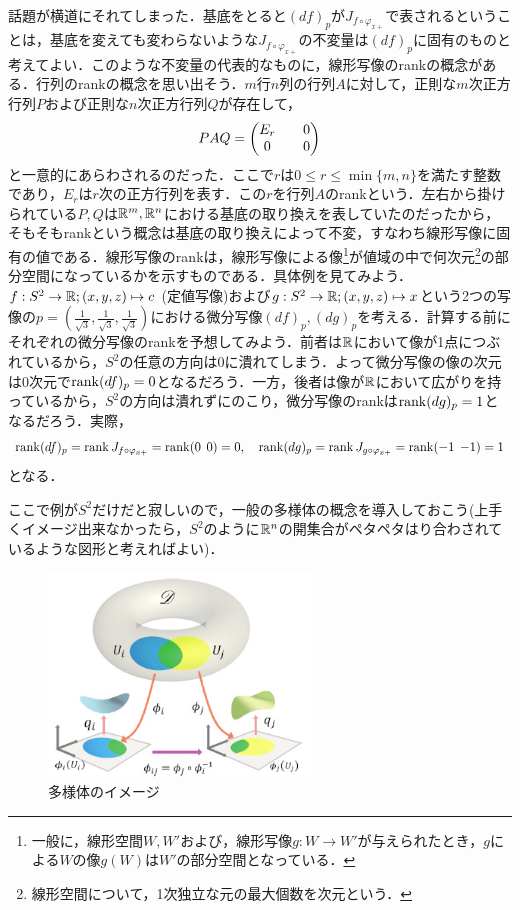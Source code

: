 話題が横道にそれてしまった．基底をとると$(df)_p$が$J_{f\circ\varphi_{x+}}$で表されるということは，基底を変えても変わらないような$J_{f\circ\varphi_{x+}}$の不変量は$(df)_p$に固有のものと考えてよい．このような不変量の代表的なものに，線形写像のrankの概念がある．行列のrankの概念を思い出そう．$m$行$n$列の行列$A$に対して，正則な$m$次正方行列$P$および正則な$n$次正方行列$Q$が存在して，
$$
PAQ=\begin{pmatrix} E_r && 0 \\ 0 && 0 \end{pmatrix}
$$
と一意的にあらわされるのだった．ここで$r$は$0\le r \le \min\{m,n\}$を満たす整数であり，$E_r$は$r$次の正方行列を表す．この$r$を行列$A$のrankという．左右から掛けられている$P,Q$は${\mathbb R}^m,{\mathbb R}^n$における基底の取り換えを表していたのだったから，そもそもrankという概念は基底の取り換えによって不変，すなわち線形写像に固有の値である．線形写像のrankは，線形写像による像\footnote{一般に，線形空間$W,W'$および，線形写像$g:W\rightarrow W'$が与えられたとき，$g$による$W$の像$g(W)$は$W'$の部分空間となっている．}が値域の中で何次元\footnote{線形空間について，1次独立な元の最大個数を次元という．}の部分空間になっているかを示すものである．具体例を見てみよう．$f:S^2\rightarrow{\mathbb R};(x,y,z)\mapsto c$ (定値写像)および$g:S^2\rightarrow{\mathbb R};(x,y,z)\mapsto x$という2つの写像の$p=\left(\frac{1}{\sqrt{3}},\frac{1}{\sqrt{3}},\frac{1}{\sqrt{3}}\right)$における微分写像$(df)_p,(dg)_p$を考える．計算する前にそれぞれの微分写像のrankを予想してみよう．前者は${\mathbb R}$において像が1点につぶれているから，$S^2$の任意の方向は0に潰れてしまう．よって微分写像の像の次元は0次元で$\operatorname{rank}(df)_p=0$となるだろう．一方，後者は像が${\mathbb R}$において広がりを持っているから，$S^2$の方向は潰れずにのこり，微分写像のrankは$\operatorname{rank}(dg)_p=1$となるだろう．実際，
$$
\operatorname{rank}(df)_p=\operatorname{rank} J_{f\circ\varphi_{x+}}=\operatorname{rank}(0\:\:0)=0,\quad\operatorname{rank}(dg)_p=\operatorname{rank} J_{g\circ\varphi_{x+}}=\operatorname{rank}(-1\:\:{-1})=1
$$
となる．


ここで例が$S^2$だけだと寂しいので，一般の多様体の概念を導入しておこう(上手くイメージ出来なかったら，$S^2$のように${\mathbb R}^n$の開集合がペタペタはり合わされているような図形と考えればよい)．
\begin{figure}[h]
  \begin{center} 
    \includegraphics[width=7.0cm]{dev_manifold}
    \caption{多様体のイメージ}
  \end{center}
\end{figure}

